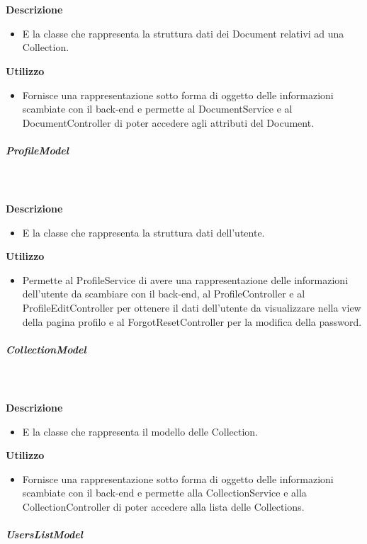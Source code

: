         \textbf{\\ \\ Descrizione} 
          \begin{itemize}
            \item[] E la classe che rappresenta la struttura dati dei Document relativi ad una Collection.
          \end{itemize}      
        \textbf{Utilizzo}  
          \begin{itemize}
            \item[] Fornisce una rappresentazione sotto forma di oggetto delle informazioni scambiate con il back-end e permette al DocumentService e al DocumentController di poter accedere agli attributi del Document.
          \end{itemize}
      \subparagraph{ProfileModel}
        
        \textbf{\\ \\ Descrizione} 
          \begin{itemize}
            \item[] E la classe che rappresenta la struttura dati dell'utente.
          \end{itemize}      
        \textbf{Utilizzo}  
          \begin{itemize}
            \item[] Permette al ProfileService di avere una rappresentazione delle informazioni dell'utente da scambiare con il back-end, al ProfileController e al ProfileEditController per ottenere il dati dell'utente da visualizzare nella view della pagina profilo e al ForgotResetController per la modifica della password.
          \end{itemize}
      \subparagraph{CollectionModel}
        
        \textbf{\\ \\ Descrizione} 
          \begin{itemize}
            \item[] E la classe che rappresenta il modello delle Collection.
          \end{itemize}      
        \textbf{Utilizzo}  
          \begin{itemize}
            \item[] Fornisce una rappresentazione sotto forma di oggetto delle informazioni scambiate con il back-end e permette alla CollectionService e alla CollectionController di poter accedere alla lista delle Collections.
          \end{itemize}
      \subparagraph{UsersListModel}
        
